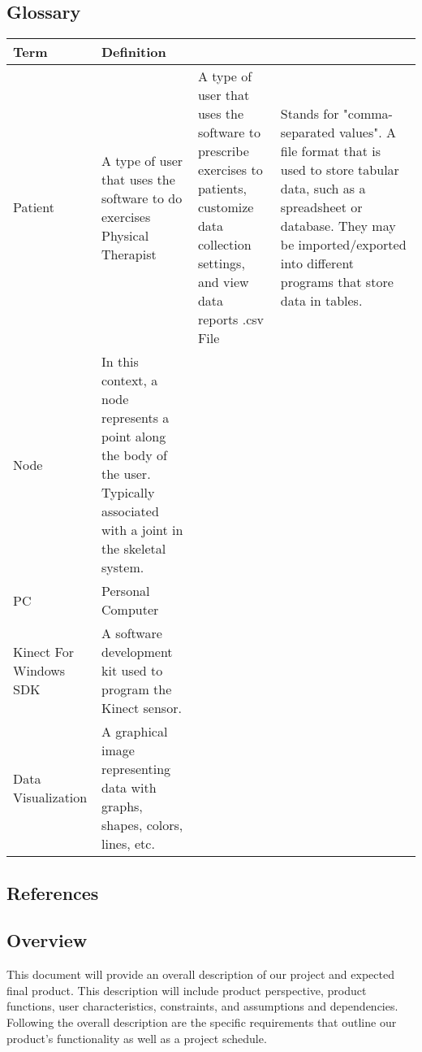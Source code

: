\documentclass[onecolumn, draftclsnofoot,10pt, compsoc]{IEEEtran}
\begin{document}
\subsection{Glossary}
        \begin{tabu} to 
        \hline
        \textbf{Term} & \textbf{Definition}\\
        \hline
        Patient & A type of user that uses the software to do exercises
        \hline
        Physical Therapist & A type of user that uses the software to prescribe exercises to patients, customize data collection settings, and view data reports
        \hline
        .csv File & Stands for "comma-separated values". A file format that is used to store tabular data, such as a spreadsheet or database. They may be imported/exported into different programs that store data in tables\cite{csvFile}.\\
        \hline
        Node & In this context, a node represents a point along the body of the user. Typically associated with a joint in the skeletal system\cite{KinectDevelop}.\\
        \hline
        PC & Personal Computer\\
        \hline
        Kinect For Windows SDK & A software development kit used to program the Kinect sensor\cite{KinectDevelop}.\\
        \hline
        Data Visualization & A graphical image representing data with graphs, shapes, colors, lines, etc.\\
        \hline
\end{tabu}
\subsection{References}



\newpage
\subsection{Overview}
This document will provide an overall description of our project and expected final 
product. This description will include product perspective, product functions, user 
characteristics, constraints, and assumptions and dependencies. Following the overall 
description are the specific requirements that outline our product's functionality as 
well as a project schedule.
\end{document}
